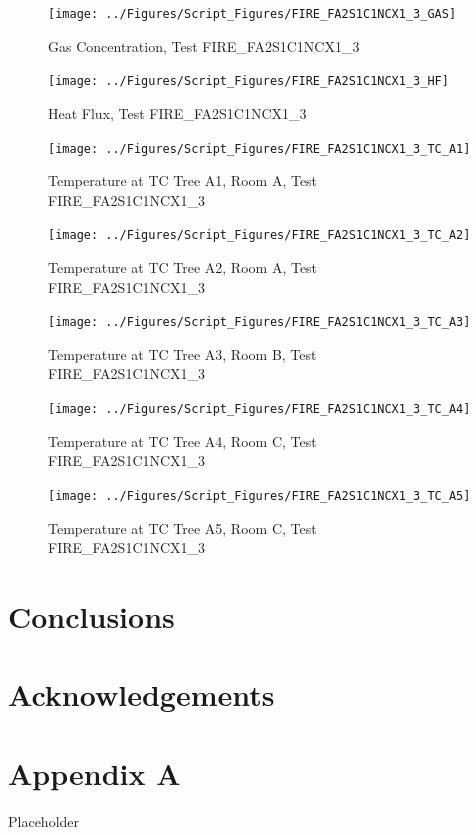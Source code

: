 \documentclass[12pt,oneside]{book}
\begin{document}
\begin{figure}[!ht]
\texttt{[image: ../Figures/Script\_Figures/FIRE\_FA2S1C1NCX1\_3\_GAS]}
\caption{Gas Concentration, Test FIRE\_FA2S1C1NCX1\_3}
\label{fig:FIRE_FA2S1C1NCX1_3_GAS}
\end{figure}

\begin{figure}[!ht]
\texttt{[image: ../Figures/Script\_Figures/FIRE\_FA2S1C1NCX1\_3\_HF]}
\caption{Heat Flux, Test FIRE\_FA2S1C1NCX1\_3}
\label{fig:FIRE_FA2S1C1NCX1_3_HF}
\end{figure}

\begin{figure}[!ht]
\texttt{[image: ../Figures/Script\_Figures/FIRE\_FA2S1C1NCX1\_3\_TC\_A1]}
\caption{Temperature at TC Tree A1, Room A, Test FIRE\_FA2S1C1NCX1\_3}
\label{fig:FIRE_FA2S1C1NCX1_3_TC_A1}
\end{figure}

\begin{figure}[!ht]
\texttt{[image: ../Figures/Script\_Figures/FIRE\_FA2S1C1NCX1\_3\_TC\_A2]}
\caption{Temperature at TC Tree A2, Room A, Test FIRE\_FA2S1C1NCX1\_3}
\label{fig:FIRE_FA2S1C1NCX1_3_TC_A2}
\end{figure}

\begin{figure}[!ht]
\texttt{[image: ../Figures/Script\_Figures/FIRE\_FA2S1C1NCX1\_3\_TC\_A3]}
\caption{Temperature at TC Tree A3, Room B, Test FIRE\_FA2S1C1NCX1\_3}
\label{fig:FIRE_FA2S1C1NCX1_3_TC_A3}
\end{figure}

\begin{figure}[!ht]
\texttt{[image: ../Figures/Script\_Figures/FIRE\_FA2S1C1NCX1\_3\_TC\_A4]}
\caption{Temperature at TC Tree A4, Room C, Test FIRE\_FA2S1C1NCX1\_3}
\label{fig:FIRE_FA2S1C1NCX1_3_TC_A4}
\end{figure}

\begin{figure}[!ht]
\texttt{[image: ../Figures/Script\_Figures/FIRE\_FA2S1C1NCX1\_3\_TC\_A5]}
\caption{Temperature at TC Tree A5, Room C, Test FIRE\_FA2S1C1NCX1\_3}
\label{fig:FIRE_FA2S1C1NCX1_3_TC_A5}
\end{figure}


\clearpage


\chapter{Conclusions}
\label{chap:Conclusions}

\chapter{Acknowledgements}
\label{chap:Acknowledgements}



\appendix

\chapter{Appendix A}

Placeholder
\end{document}
